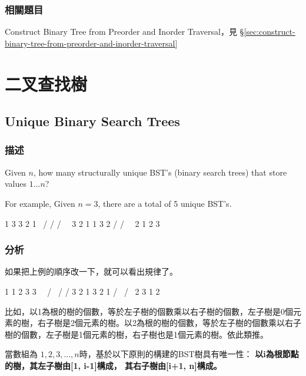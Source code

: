 \subsubsection{相關題目}
\begindot
\item Construct Binary Tree from Preorder and Inorder Traversal，見 \S \ref{sec:construct-binary-tree-from-preorder-and-inorder-traversal}
\myenddot


\section{二叉查找樹} %


\subsection{Unique Binary Search Trees}
\label{sec:unique-binary-search-trees}


\subsubsection{描述}
Given $n$, how many structurally unique BST's (binary search trees) that store values $1...n$?

For example,
Given $n = 3$, there are a total of 5 unique BST's.
\begin{Code}
   1         3     3      2      1
    \       /     /      / \      \
     3     2     1      1   3      2
    /     /       \                 \
   2     1         2                 3
\end{Code}

\subsubsection{分析}
如果把上例的順序改一下，就可以看出規律了。
\begin{Code}
 1       1           2          3       3
  \       \         / \        /       / 
   3       2       1   3      2       1
  /         \                /         \
2            3              1           2
\end{Code}

比如，以1為根的樹的個數，等於左子樹的個數乘以右子樹的個數，左子樹是0個元素的樹，右子樹是2個元素的樹。以2為根的樹的個數，等於左子樹的個數乘以右子樹的個數，左子樹是1個元素的樹，右子樹也是1個元素的樹。依此類推。

當數組為 $1,2,3,...,n$時，基於以下原則的構建的BST樹具有唯一性：
\textbf{以i為根節點的樹，其左子樹由[1, i-1]構成， 其右子樹由[i+1, n]構成。}

